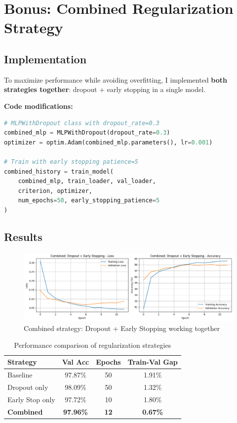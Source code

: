 \section{Bonus: Combined Regularization Strategy}

\subsection{Implementation}

To maximize performance while avoiding overfitting, I implemented \textbf{both strategies together}: dropout + early stopping in a single model.

\textbf{Code modifications:}
\begin{lstlisting}[language=Python]
# MLPWithDropout class with dropout_rate=0.3
combined_mlp = MLPWithDropout(dropout_rate=0.3)
optimizer = optim.Adam(combined_mlp.parameters(), lr=0.001)

# Train with early stopping patience=5
combined_history = train_model(
    combined_mlp, train_loader, val_loader, 
    criterion, optimizer,
    num_epochs=50, early_stopping_patience=5
)
\end{lstlisting}

\subsection{Results}

\begin{figure}[h]
    \centering
    \includegraphics[width=0.7\linewidth]{section6/combined.png}
    \caption{Combined strategy: Dropout + Early Stopping working together}
    \label{fig:combined}
\end{figure}

\begin{table}[h]
\centering
\begin{tabular}{|l|c|c|c|}
\hline
\textbf{Strategy} & \textbf{Val Acc} & \textbf{Epochs} & \textbf{Train-Val Gap} \\ \hline
Baseline & 97.87\% & 50 & 1.91\% \\ \hline
Dropout only & 98.09\% & 50 & 1.32\% \\ \hline
Early Stop only & 97.72\% & 10 & 1.80\% \\ \hline
\textbf{Combined} & \textbf{97.96\%} & \textbf{12} & \textbf{0.67\%} \\ \hline
\end{tabular}
\caption{Performance comparison of regularization strategies}
\label{tab:combined-results}
\end{table}

